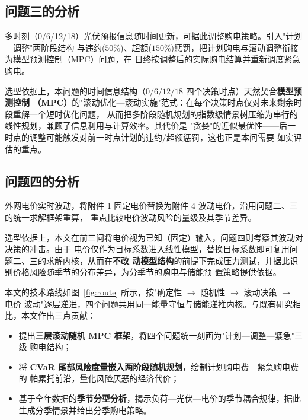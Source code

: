 \documentclass[withoutpreface]{cumcmthesis}
\begin{document}
\subsection{问题三的分析}
多时刻（0/6/12/18）光伏预报信息随时间更新，可据此调整购电策略。引入"计划—调整"两阶段结构
与违约($50\%$)、超额($150\%$)惩罚，把计划购电与滚动调整衔接为模型预测控制（MPC）问题，在
日终按调整后的实际购电结算并重新调度紧急购电。

选型依据上，本问题的时间信息结构（$0/6/12/18$ 四个决策时点）天然契合\textbf{模型预测控制
（MPC）}的"滚动优化—滚动实施"范式：在每个决策时点仅对未来剩余时段重解一个短时优化问题，
从而把多阶段随机规划的指数级情景树压缩为串行的线性规划，兼顾了信息利用与计算效率。其代价是
"贪婪"的近似最优性——后一时点的调整可能触发对前一时点计划的违约/超额惩罚，这也正是本问需要
如实评估的重点。

\subsection{问题四的分析}
外网电价实时波动，将附件 1 固定电价替换为附件 4 波动电价，沿用问题二、三的统一求解框架重算，
重点比较电价波动风险的量级及其季节差异。

选型依据上，本文在前三问将电价视为已知（固定）输入，问题四则考察其波动对决策的冲击。由于
电价仅作为目标系数进入线性模型，替换目标系数即可复用问题二、三的求解内核，从而在\textbf{不改
动模型结构}的前提下完成压力测试，并据此识别价格风险随季节的分布差异，为分季节的购电与储能预
置策略提供依据。

本文的技术路线如图~\ref{fig:route} 所示，按"确定性 $\to$ 随机性 $\to$ 滚动决策 $\to$ 电价
波动"逐层递进，四个问题共用同一能量守恒与储能递推内核。与既有研究相比，本文作出三点贡献：
\begin{itemize}
    \item 提出\textbf{三层滚动随机 MPC 框架}，将四个问题统一刻画为"计划—调整—紧急"三级
          购电结构；
    \item 将 \textbf{CVaR 尾部风险度量嵌入两阶段随机规划}，绘制计划购电费—紧急购电费的
          帕累托前沿，量化风险厌恶的经济代价；
    \item 基于全年数据的\textbf{季节分型分析}，揭示负荷—光伏—电价的季节耦合规律，据此
          生成分季情景并给出分季购电策略。
\end{itemize}
\end{document}
